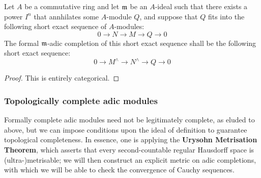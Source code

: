                 \begin{proposition} \label{prop: formal_completions_along_annihilating_ideals}
                    Let $A$ be a commutative ring and let $\mathfrak{m}$ be an $A$-ideal such that there exists a power $I^n$ that annhilates some $A$-module $Q$, and suppose that $Q$ fits into the following short exact sequence of $A$-modules:
                        $$0 \to N \to M \to Q \to 0$$
                    The formal $\mathfrak{m}$-adic completion of this short exact sequence shall be the following short exact sequence:
                        $$0 \to M^{\wedge} \to N^{\wedge} \to Q \to 0$$
                \end{proposition}
                    \begin{proof}
                        This is entirely categorical.
                    \end{proof}
            
            \subsubsection{Topologically complete adic modules}
                Formally complete adic modules need not be legitimately complete, as eluded to above, but we can impose conditions upon the ideal of definition to guarantee topological completeness. In essence, one is applying the \textbf{Urysohn Metrisation Theorem}, which asserts that every second-countable regular Hausdorff space is (ultra-)metrisable; we will then construct an explicit metric on adic completions, with which we will be able to check the convergence of Cauchy sequences.
                

